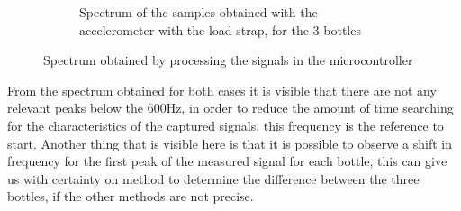 \begin{figure}[]
\begin{subfigure}{0.45\textwidth}
        \caption{Spectrum of the samples obtained with the accelerometer with the load strap, for the 3 bottles}{}
        \label{subfig:specAccuC}
    \end{subfigure}
    \caption{Spectrum obtained by processing the signals in the microcontroller}{}
    \label{fig:specuC}
\end{figure}

From the spectrum obtained for both cases it is visible that there are not any relevant peaks below the 600Hz, in order to reduce the amount of time searching for the characteristics of the captured signals, this frequency is the reference to start. Another thing that is visible here is that it is possible to observe a shift in frequency for the first peak of the measured signal for each bottle, this can give us with certainty on method to determine the difference between the three bottles, if the other methods are not precise.

